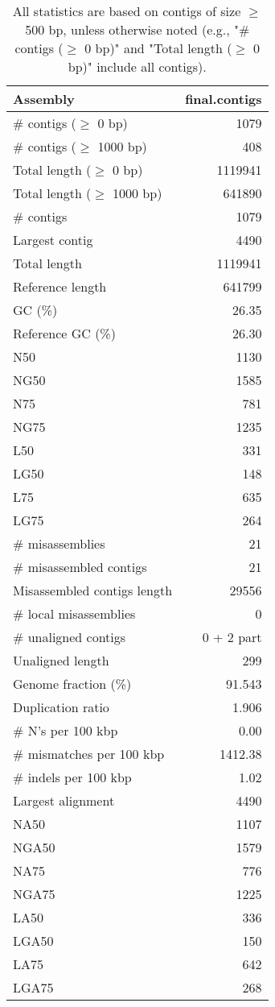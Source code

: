 \documentclass[12pt,a4paper]{article}
\begin{document}
\begin{table}[ht]
\begin{center}
\caption{All statistics are based on contigs of size $\geq$ 500 bp, unless otherwise noted (e.g., "\# contigs ($\geq$ 0 bp)" and "Total length ($\geq$ 0 bp)" include all contigs).}
\begin{tabular}{|l*{1}{|r}|}
\hline
Assembly & final.contigs \\ \hline
\# contigs ($\geq$ 0 bp) & 1079 \\ \hline
\# contigs ($\geq$ 1000 bp) & 408 \\ \hline
Total length ($\geq$ 0 bp) & 1119941 \\ \hline
Total length ($\geq$ 1000 bp) & 641890 \\ \hline
\# contigs & 1079 \\ \hline
Largest contig & 4490 \\ \hline
Total length & 1119941 \\ \hline
Reference length & 641799 \\ \hline
GC (\%) & 26.35 \\ \hline
Reference GC (\%) & 26.30 \\ \hline
N50 & 1130 \\ \hline
NG50 & 1585 \\ \hline
N75 & 781 \\ \hline
NG75 & 1235 \\ \hline
L50 & 331 \\ \hline
LG50 & 148 \\ \hline
L75 & 635 \\ \hline
LG75 & 264 \\ \hline
\# misassemblies & 21 \\ \hline
\# misassembled contigs & 21 \\ \hline
Misassembled contigs length & 29556 \\ \hline
\# local misassemblies & 0 \\ \hline
\# unaligned contigs & 0 + 2 part \\ \hline
Unaligned length & 299 \\ \hline
Genome fraction (\%) & 91.543 \\ \hline
Duplication ratio & 1.906 \\ \hline
\# N's per 100 kbp & 0.00 \\ \hline
\# mismatches per 100 kbp & 1412.38 \\ \hline
\# indels per 100 kbp & 1.02 \\ \hline
Largest alignment & 4490 \\ \hline
NA50 & 1107 \\ \hline
NGA50 & 1579 \\ \hline
NA75 & 776 \\ \hline
NGA75 & 1225 \\ \hline
LA50 & 336 \\ \hline
LGA50 & 150 \\ \hline
LA75 & 642 \\ \hline
LGA75 & 268 \\ \hline
\end{tabular}
\end{center}
\end{table}
\end{document}
